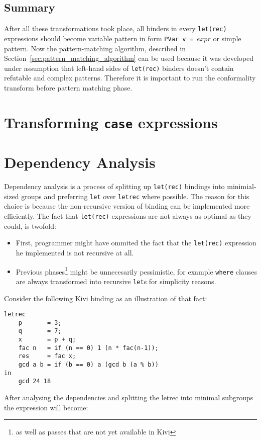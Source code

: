 \documentclass[12pt,a4paper]{report}
\begin{document}
\subsection{Summary}
After all these transformations took place, all binders in every
\texttt{let(rec)} expressions should become variable pattern in form
\texttt{PVar v = $expr$} or simple pattern. Now the pattern-matching algorithm,
described in Section~\ref{sec:pattern_matching_algorithm} can be used because
it was developed under assumption that left-hand sides of \texttt{let(rec)}
binders doesn't contain refutable and complex patterns. Therefore it is
important to run the conformality transform before pattern matching phase.

\section{Transforming \texttt{case} expressions}

\section{Dependency Analysis}
Dependency analysis is a process of splitting up \texttt{let(rec)} bindings
into minimial-sized groups and preferring \texttt{let} over \texttt{letrec}
where possible. The reason for this choice is because the non-recursive version
of binding can be implemented more efficiently. The fact that \texttt{let(rec)}
expressions are not always as optimal as they could, is twofold:
\begin{itemize}
  \item First, programmer might have ommited the fact that the
    \texttt{let(rec)} expression he implemented is not recursive at all.
  \item Previous phases\footnote{as well as passes that are not yet available
    in Kivi} might be unnecesarily pessimistic, for example \texttt{where}
    clauses are always transformed into recursive \texttt{let}s for simplicity
    reasons.
\end{itemize}
Consider the following Kivi binding as an illustration of that fact:

\hspace*{-1.5in}
\begin{lstlisting}[style=haskell,label=lst:letrec_dependency_example,caption={Example of
  \texttt{letrec} before dependency analysis.}]
letrec
    p       = 3;
    q       = 7;
    x       = p + q;
    fac n   = if (n == 0) 1 (n * fac(n-1));
    res     = fac x;
    gcd a b = if (b == 0) a (gcd b (a % b))
in
    gcd 24 18
\end{lstlisting}
After analysing the dependencies and splitting the letrec into minimal
subgroups the expression will become:
\end{document}
